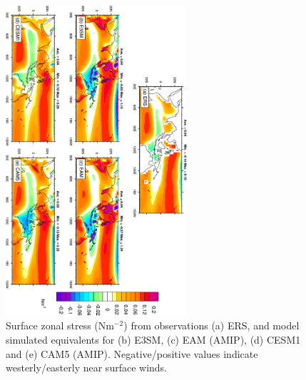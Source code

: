\documentclass[draft,ms]{AGUTeX}
\begin{document}
\begin{article}
\begin{figure}[t]
  \begin{center}
   \noindent\includegraphics[width=0.6\textwidth,angle=90.]{./figs/f_E3SM_EAM_TAUX_DJF.pdf}
  \end{center}
  \caption{Surface zonal stress (Nm$^{-2}$) from observations (a) ERS, and model simulated equivalents for (b) E3SM, (c) EAM (AMIP), (d) CESM1 and (e) CAM5 (AMIP). Negative/positive values indicate westerly/easterly near surface winds.} 
\label{f_E3SM_EAM_TAUX_DJF}
\end{figure}


\end{article}
\end{document}
